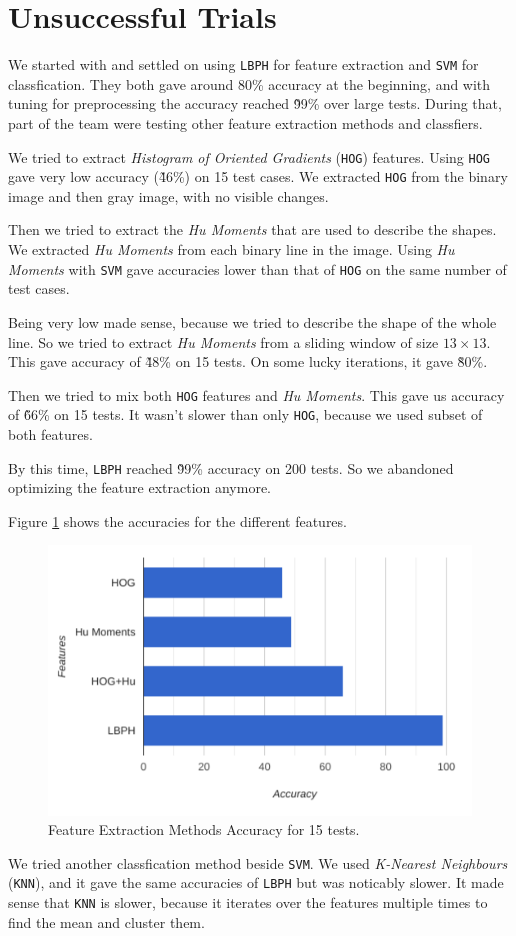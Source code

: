 \section{Unsuccessful Trials}
We started with and settled on using \texttt{LBPH} for feature extraction and \texttt{SVM} for classfication.
They both gave around 80\% accuracy at the beginning, and with tuning for preprocessing the accuracy reached \~99\% over large tests.
During that, part of the team were testing other feature extraction methods and classfiers.

We tried to extract \emph{Histogram of Oriented Gradients} (\texttt{HOG}) features.
Using \texttt{HOG} gave very low accuracy (\~46\%) on 15 test cases.
We extracted \texttt{HOG} from the binary image and then gray image, with no visible changes.

Then we tried to extract the \emph{Hu Moments} that are used to describe the shapes.
We extracted \emph{Hu Moments} from each binary line in the image.
Using \emph{Hu Moments} with \texttt{SVM} gave accuracies lower than that of \texttt{HOG} on the same number of test cases.

Being very low made sense, because we tried to describe the shape of the whole line.
So we tried to extract \emph{Hu Moments} from a sliding window of size $13\times13$.
This gave accuracy of \~48\% on 15 tests.
On some lucky iterations, it gave \~80\%.

Then we tried to mix both \texttt{HOG} features and \emph{Hu Moments}.
This gave us accuracy of \~66\% on 15 tests.
It wasn't slower than only \texttt{HOG}, because we used subset of both features.

By this time, \texttt{LBPH} reached \~99\% accuracy on 200 tests.
So we abandoned optimizing the feature extraction anymore.

Figure \ref{fig:unsuccBar} shows the accuracies for the different features.

\begin{figure}
    \centering
    \includegraphics[width=0.9\linewidth]{figures/unsuccBar.png}
    \caption{Feature Extraction Methods Accuracy for 15 tests.}
    \label{fig:unsuccBar}
\end{figure}

We tried another classfication method beside \texttt{SVM}.
We used \emph{K-Nearest Neighbours} (\texttt{KNN}), and it gave the same accuracies of \texttt{LBPH} but was noticably slower.
It made sense that \texttt{KNN} is slower, because it iterates over the features multiple times to find the mean and cluster them.
